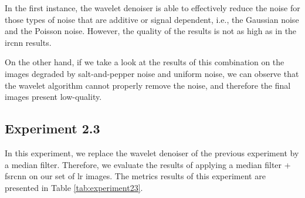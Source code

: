 In the first instance, the wavelet denoiser is able to effectively reduce the noise for those types of noise that are additive or signal dependent, i.e., the Gaussian noise and the Poisson noise. However, the quality of the results is not as high as in the \gls{ircnn} results. 

On the other hand, if we take a look at the results of this combination on the images degraded by salt-and-pepper noise and uniform noise, we can observe that the wavelet algorithm cannot properly remove the noise, and therefore the final images present low-quality.

\newpage\subsection{Experiment 2.3}
In this experiment, we replace the wavelet denoiser of the previous experiment by a median filter. Therefore, we evaluate the results of applying a median filter + \gls{fsrcnn} on our set of \gls{lr} images. The metrics results of this experiment are presented in Table \ref{tab:experiment23}.

